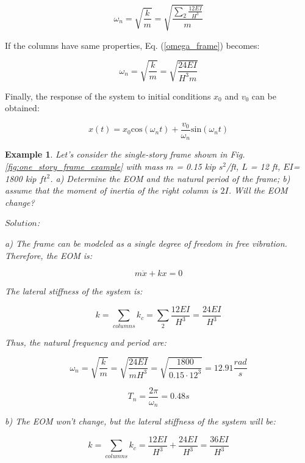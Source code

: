 \documentclass[12pt,letter]{article}
\newtheorem{ex}{Example}
\numberwithin{ex}{section} %
\newenvironment{example}{\begin{mdframed}[middlelinewidth=0.5mm]\begin{ex}\normalfont}{\end{ex}\end{mdframed}}
\numberwithin{re}{section} %
\numberwithin{vcs}{section} %
\begin{document}
\begin{equation} \label{omega_frame}
\omega_n = \sqrt{\frac{k}{m}} = \sqrt{\frac{\sum_{2}^{} \frac{12EI} {H^3}}{m}}
\end{equation}

If the columns have same properties, Eq. (\ref{omega_frame}) becomes:

\begin{equation}
\omega_n = \sqrt{\frac{k}{m}} = \sqrt{\frac{24EI}{H^3m}}
\end{equation}


Finally, the response of the system to initial conditions $x_0$ and ${v_0}$ can be obtained:

\begin{equation}
x(t) = x_0\text{cos}(\omega_n t) + \frac{v_0}{\omega_n}\text{sin}(\omega_n t)
\end{equation}	



\begin{example}
	
Let's consider the single-story frame shown in Fig. \ref{fig:one_story_frame_example} with mass $m$ = 0.15 kip $s^2$/ft, $L$ = 12 ft, $EI$= 1800 kip $ft^2$. a) Determine the EOM and the natural period of the frame; b) assume that the moment of inertia of the right column is $2I$. Will the EOM change?

\vspace{1ex}

\noindent$Solution$:

\vspace{1ex}

a) The frame can be modeled as a single degree of freedom in free vibration. Therefore, the EOM is:

\begin{equation}
	m \ddot{x} + k x = 0
\end{equation}

The lateral stiffness of the system is:

\begin{equation}
k = \sum_{columns}^{} k_c = \sum_{2}^{} \frac{12EI} {H^3} = \frac{24 EI}{H^3}
\end{equation}

Thus, the natural frequency and period are:

\begin{equation}
\omega_n = \sqrt{\frac{k}{m}} = \sqrt{\frac{24 EI}{m H^3}} = \sqrt{\frac{1800}{0.15 \cdot 12^3}} = 12.91 \frac{rad}{s}
\end{equation}

\begin{equation}
T_n =\frac{2 \pi}{\omega_n} = 0.48 s
\end{equation}

b) The EOM won't change, but the lateral stiffness of the system will be: 

\begin{equation}
k = \sum_{columns}^{} k_c = \frac{12EI} {H^3} + \frac{24EI} {H^3} = \frac{36 EI}{H^3}
\end{equation}

	
\end{example}
\end{document}
